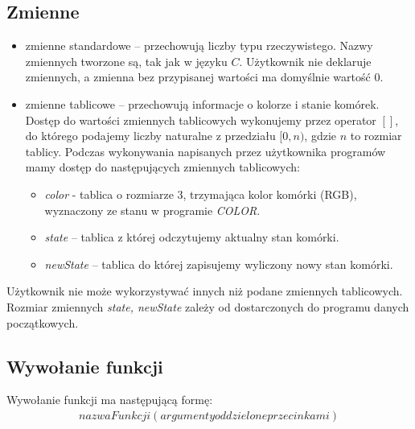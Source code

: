 \documentclass[declaration,shortabstract, inz]{iithesis}
\theoremstyle{definition} \newtheorem{definition}{Definicja}[]
\theoremstyle{plain} \newtheorem{remark}[definition]{Obserwacja}
\theoremstyle{plain} \newtheorem{theorem}[definition]{Twierdzenie}
\theoremstyle{plain} \newtheorem{example}{Przykład}[definition]
\theoremstyle{plain} \newtheorem{lemma}[definition]{Lemat}
\begin{document}
\subsection{Zmienne}
\begin{itemize}
\item zmienne standardowe -- przechowują liczby typu rzeczywistego. Nazwy zmiennych tworzone są, tak jak w języku $C$. Użytkownik nie deklaruje zmiennych, a zmienna bez przypisanej wartości ma domyślnie wartość $0$.
\item zmienne tablicowe -- przechowują informacje o kolorze i stanie komórek. Dostęp do wartości zmiennych tablicowych wykonujemy przez operator $[]$, do którego podajemy liczby naturalne z przedziału $[0, n)$, gdzie $n$ to rozmiar tablicy. Podczas wykonywania napisanych przez użytkownika programów mamy dostęp do następujących zmiennych tablicowych: 
	\begin{itemize}
	\item \textit{color} - tablica o rozmiarze $3$, trzymająca kolor komórki (RGB), wyznaczony ze stanu w programie \textit{COLOR}. 
	\item \textit{state} -- tablica z której odczytujemy aktualny stan komórki.
	\item \textit{newState} -- tablica do której zapisujemy wyliczony nowy stan komórki.
	\end{itemize}
\end{itemize}
Użytkownik nie może wykorzystywać innych niż podane zmiennych tablicowych. Rozmiar zmiennych \textit{state, newState} zależy od dostarczonych do programu danych początkowych. 

\subsection{Wywołanie funkcji}
Wywołanie funkcji ma następującą formę:
\begin{align}
nazwaFunkcji(argumenty oddzielone przecinkami)
\end{align}
\end{document}
